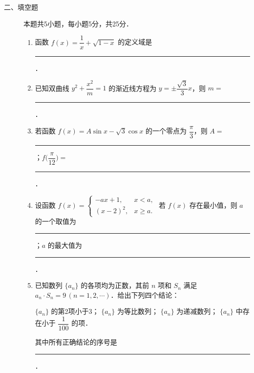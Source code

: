 \begin{description}
    \item[二、填空题] 本题共5小题，每小题5分，共25分．
    \begin{enumerate}[leftmargin=5pt]
      \addtocounter{enumi}{+10}
        \item 函数 $f(x)=\dfrac{1}{x}+\sqrt{1-x}$ 的定义域是 \rule[-0.3ex]{3em}{0.4pt}．
        \item 已知双曲线 $y^2+\dfrac{x^2}{m}=1$ 的渐近线方程为 $y=\pm\dfrac{\sqrt{3}}{3}x$，则 $m=$ \rule[-0.3ex]{3em}{0.4pt}．
        \item 若函数 $f(x)=A\sin x-\sqrt{3}\cos x$ 的一个零点为 $\dfrac{\pi}{3}$，则 $A=$ \rule[-0.3ex]{3em}{0.4pt}；$f\bigl(\dfrac{\pi}{12}\bigr)=$ \rule[-0.3ex]{3em}{0.4pt}．
        \item 设函数 $f(x)=\begin{cases}-ax+1,&x<a,\\(x-2)^2,&x\geqslant a.\end{cases}$ 若 $f(x)$ 存在最小值，则 $a$ 的一个取值为 \rule[-0.3ex]{3em}{0.4pt}；$a$ 的最大值为 \rule[-0.3ex]{3em}{0.4pt}．
        \item 已知数列 $\{a_n\}$ 的各项均为正数，其前 $n$ 项和 $S_n$ 满足 $a_n\cdot S_n=9\,(n=1,2,\cdots)$．给出下列四个结论：

        $\{a_n\}$ 的第2项小于3；
        $\{a_n\}$ 为等比数列；
        $\{a_n\}$ 为递减数列；
        $\{a_n\}$ 中存在小于 $\dfrac{1}{100}$ 的项．

        其中所有正确结论的序号是 \rule[-0.3ex]{3em}{0.4pt}．
    \end{enumerate}
\end{description}

